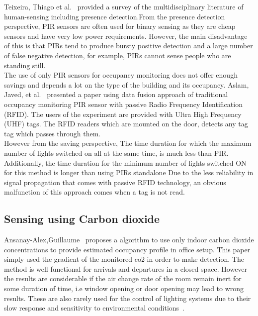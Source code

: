 Teixeira, Thiago et al.~\cite{teixeira2010survey} provided a survey of the multidisciplinary literature of human-sensing including presence detection.From the presence detection perspective, PIR sensors are often used for binary sensing as they are cheap sensors and have very low power requirements. However, the main
disadvantage of this is that PIRs tend to produce bursty positive detection and a large number of false negative
detection, for example, PIRs cannot sense people who are
standing still.
\\

The use of only PIR sensors for occupancy monitoring does not offer enough savings and depends a lot on the type of the building and its occupancy. Aslam, Javed, et al.~\cite{manzoor2012occupancy} presented a paper using data fusion approach of traditional occupancy monitoring PIR sensor with passive Radio Frequency Identification (RFID).
The users of the experiment are provided with Ultra High Frequency (UHF) tags. The RFID readers which are mounted on the door, detects any tag tag which passes through them.
\\
However from the saving perspective, The time duration for which the maximum number of lights switched on all at the same time, is much less than PIR. Additionally, the time duration for the minimum number of lights switched ON for
this method is longer than using PIRs standalone 
Due to the less reliability in signal propagation that comes with passive RFID technology, an obvious malfunction of this approach comes when a tag is not read.
\\



\subsection{Sensing using Carbon dioxide}


Ansanay-Alex,Guillaume~\cite{ansanay2013estimating} proposes a algorithm to use only indoor carbon dioxide concentrations to provide estimated occupancy profile in office setup. This paper simply used the gradient of the monitored co2 in order to make detection. The method is well functional for arrivals and departures in a closed space. However the results are considerable if the air change rate of the room remain inert for some duration of time, i.e window opening or door opening may lead to wrong  results. These are also rarely used for the control of lighting systems due to their slow response and sensitivity to environmental conditions~\cite{teixeira2010survey}.
\\

